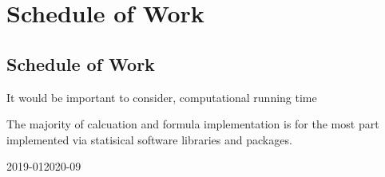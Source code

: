 \chapter{Schedule of Work}
\label{Chapter3} %





\section{Schedule of Work}

It would be important to consider, computational running time

The majority of calcuation and formula implementation is for the most part implemented via statisical software libraries and packages.



\medskip


\begin{ganttchart}[
	time slot format=isodate-yearmonth,
	time slot unit=month,
	]{2019-01}{2020-09}
	 \\
	 \\
	 \\
	 \\
	 \\
	 \\
	 \\
	
\end{ganttchart}

